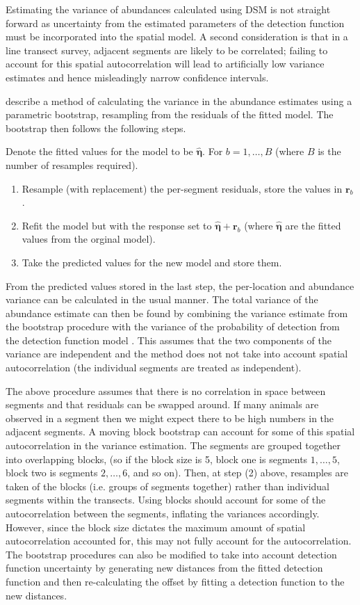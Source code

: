 \documentclass[a4paper,12pt]{article}
\begin{document}
Estimating the variance of abundances calculated using DSM is not straight forward as uncertainty from the estimated parameters of the detection function must be incorporated into the spatial model. A second consideration is that in a line transect survey, adjacent segments are likely to be correlated; failing to account for this spatial autocorrelation will lead to artificially low variance estimates and hence misleadingly narrow confidence intervals.

\cite{Hedley:2004et} describe a method of calculating the variance in the abundance estimates using a parametric bootstrap, resampling from the residuals of the fitted model. The bootstrap then follows the following steps.

Denote the fitted values for the model to be $\hat{\bm{\eta}}$. For $b=1,\ldots,B$ (where $B$ is the number of resamples required).
\begin{enumerate}
	\item Resample (with replacement) the per-segment residuals, store the values in $\mathbf{r}_{b}$.
	\item Refit the model but with the response set to $\hat{\bm{\eta}}+\mathbf{r}_{b}$ (where $\hat{\bm{\eta}}$ are the fitted values from the orginal model).
	\item Take the predicted values for the new model and store them.
\end{enumerate}
From the predicted values stored in the last step, the per-location and abundance variance can be calculated in the usual manner. The total variance of the abundance estimate can then be found by combining the variance estimate from the bootstrap procedure with the variance of the probability of detection from the detection function model \citep[using the delta method;][]{Seber:2002ti}. This assumes that the two components of the variance are independent and the method does not not take into account spatial autocorrelation (the individual segments are treated as independent).

The above procedure assumes that there is no correlation in space between segments and that residuals can be swapped around. If many animals are observed in a segment then we might expect there to be high numbers in the adjacent segments. A moving block bootstrap \citep[MBB;][Section 8.6]{Efron:1993tv} can account for some of this spatial autocorrelation in the variance estimation. The segments are grouped together into overlapping blocks, (so if the block size is 5, block one is segments $1,\ldots,5$, block two is segments $2,\ldots,6$, and so on). Then, at step (2) above, resamples are taken of the blocks (i.e. groups of segments together) rather than individual segments within the transects. Using blocks should account for some of the autocorrelation between the segments, inflating the variances accordingly. However, since the block size dictates the maximum amount of spatial autocorrelation accounted for, this may not fully account for the autocorrelation. The bootstrap procedures can also be modified to take into account detection function uncertainty by generating new distances from the fitted detection function and then re-calculating the offset by fitting a detection function to the new distances.
 
\end{document}
